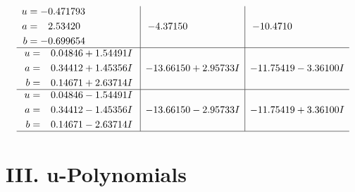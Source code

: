 \documentclass[1p]{elsarticle_modified}
\theoremstyle{definition}
\begin{document}
$$\begin{array}{c|c|c}
\begin{aligned}
u &= -0.471793\phantom{ +0.000000I} \\
a &= \phantom{-}2.53420\phantom{ +0.000000I} \\
b &= -0.699654\phantom{ +0.000000I}\end{aligned}
 & -4.37150\phantom{ +0.000000I} & -10.4710\phantom{ +0.000000I} \\ \hline\begin{aligned}
u &= \phantom{-}0.04846 + 1.54491 I \\
a &= \phantom{-}0.34412 + 1.45356 I \\
b &= \phantom{-}0.14671 + 2.63714 I\end{aligned}
 & -13.66150 + 2.95733 I & -11.75419 - 3.36100 I \\ \hline\begin{aligned}
u &= \phantom{-}0.04846 - 1.54491 I \\
a &= \phantom{-}0.34412 - 1.45356 I \\
b &= \phantom{-}0.14671 - 2.63714 I\end{aligned}
 & -13.66150 - 2.95733 I & -11.75419 + 3.36100 I\\
 \hline 
 \end{array}$$\newpage
\newpage\renewcommand{\arraystretch}{1}
\centering \section*{ III. u-Polynomials}
\end{document}

